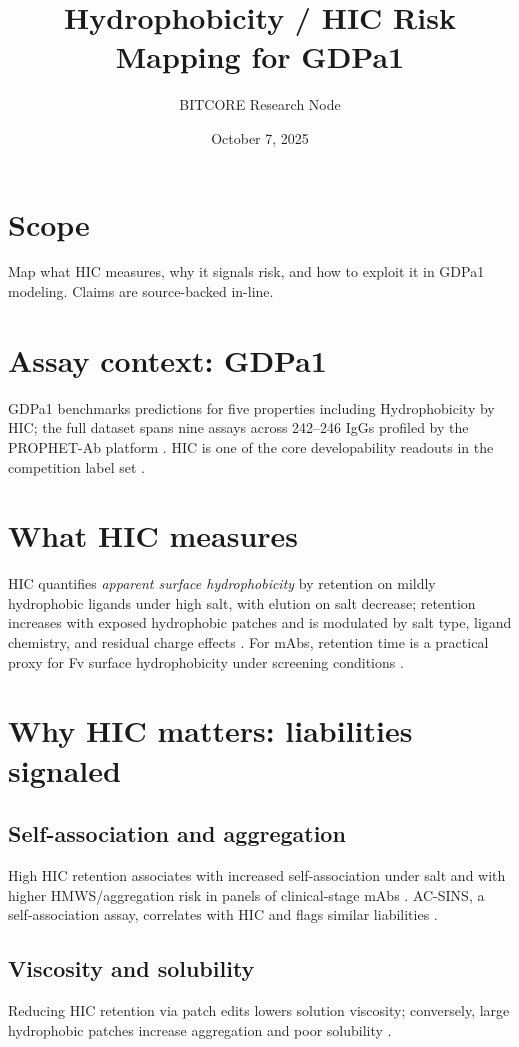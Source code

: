\documentclass[11pt]{article}
\title{Hydrophobicity / HIC Risk Mapping for GDPa1}
\date{October 7, 2025}
\author{BITCORE Research Node}
\begin{document}
\maketitle

\section*{Scope}
Map what HIC measures, why it signals risk, and how to exploit it in GDPa1 modeling. Claims are source-backed in-line.

\section{Assay context: GDPa1}
GDPa1 benchmarks predictions for five properties including Hydrophobicity by HIC; the full dataset spans nine assays across 242--246 IgGs profiled by the PROPHET-Ab platform \citep{GDPa1Rules2025,GDPa1HF,Arsiwala2025}. HIC is one of the core developability readouts in the competition label set \citep{GDPa1Rules2025,GDPa1HF}.

\section{What HIC measures}
HIC quantifies \emph{apparent surface hydrophobicity} by retention on mildly hydrophobic ligands under high salt, with elution on salt decrease; retention increases with exposed hydrophobic patches and is modulated by salt type, ligand chemistry, and residual charge effects \citep{Ewonde2024, EwondeProtocol2022, Fekete2016, Baca2016}. For mAbs, retention time is a practical proxy for Fv surface hydrophobicity under screening conditions \citep{Waibl2022, Jain2017Bioinf, Karlberg2020}.

\section{Why HIC matters: liabilities signaled}
\subsection*{Self-association and aggregation}
High HIC retention associates with increased self-association under salt and with higher HMWS/aggregation risk in panels of clinical-stage mAbs \citep{Estep2015,Hebditch2019}. AC-SINS, a self-association assay, correlates with HIC and flags similar liabilities \citep{Estep2015}. 

\subsection*{Viscosity and solubility}
Reducing HIC retention via patch edits lowers solution viscosity; conversely, large hydrophobic patches increase aggregation and poor solubility \citep{Armstrong2024,Park2024}. 
\end{document}
